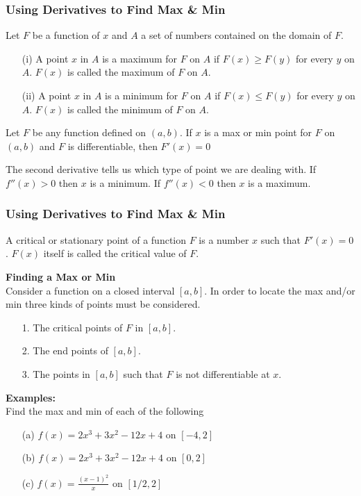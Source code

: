 \documentclass{beamer}
\begin{document}
\begin{frame}
\frametitle{\textbf{Using Derivatives to Find Max \& Min}}
Let $F$ be a function of $x$ and $A$ a set of numbers contained on the domain of $F$. 
\begin{itemize}
	\item[(i)] A point $x$ in $A$ is a maximum for $F$ on $A$ if $F(x) \geq F(y)$ for every $y$ on $A$. $F(x)$ is called the maximum of $F$ on $A$.
	\item[(ii)] A point $x$ in $A$ is a minimum for $F$ on $A$ if $F(x) \leq F(y)$ for every $y$ on $A$. $F(x)$ is called the minimum of $F$ on $A$.
\end{itemize}

\begin{theorem}
	Let $F$ be any function defined on $(a,b)$. If $x$ is a max or min point for $F$ on $(a,b)$ and $F$ is differentiable, then $F'(x)=0$
\end{theorem}

 The second derivative tells us which type of point we are dealing with. If $f''(x)>0$ then $x$ is a minimum. If $f''(x)<0$ then $x$ is a maximum.

\end{frame}

\begin{frame}
\frametitle{\textbf{Using Derivatives to Find Max \& Min}}
A critical or stationary point of a function $F$ is a number $x$ such that $F'(x)=0$. $F(x)$ itself is called the critical value of $F$.

\vspace{6pt}
\textbf{Finding a Max or Min}\\
Consider a function on a closed interval $[a,b]$. In order to locate the max and/or min three kinds of points must be considered. 
\begin{itemize}
	\item[1.]The critical points of $F$ in $[a,b]$.
	\item[2.]The end points of $[a,b]$.
	\item[3.]The points in $[a,b]$ such that $F$ is not differentiable at $x$.
\end{itemize}

\vspace{6pt}
\textbf{Examples:}\\
Find the max and min of each of the following
\begin{itemize}
	\item[(a)] $f(x) = 2x^3+3x^2-12x+4$ on $[-4,2]$
	\item[(b)]$f(x) = 2x^3+3x^2-12x+4$ on $[0,2]$
	\item[(c)] $f(x)=\frac{(x-1)^2}{x}$ on $[1/2,2]$
\end{itemize}
\end{frame}
\end{document}
